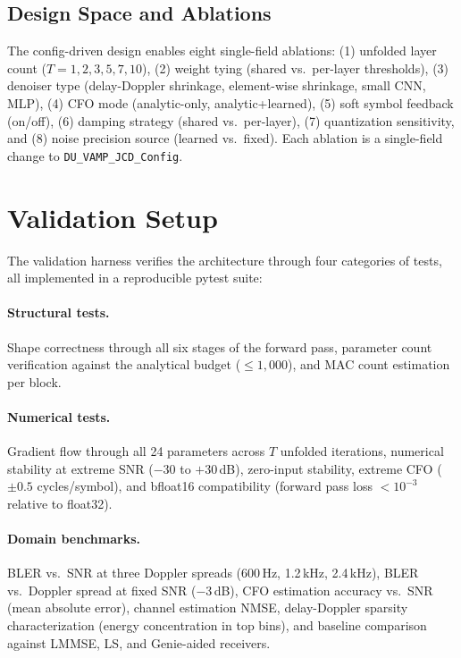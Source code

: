 \documentclass{article}
\begin{document}
\subsection{Design Space and Ablations}

The config-driven design enables eight single-field ablations: (1) unfolded layer count ($T = 1, 2, 3, 5, 7, 10$), (2) weight tying (shared vs.\ per-layer thresholds), (3) denoiser type (delay-Doppler shrinkage, element-wise shrinkage, small CNN, MLP), (4) CFO mode (analytic-only, analytic+learned), (5) soft symbol feedback (on/off), (6) damping strategy (shared vs.\ per-layer), (7) quantization sensitivity, and (8) noise precision source (learned vs.\ fixed). Each ablation is a single-field change to \texttt{DU\_VAMP\_JCD\_Config}.

\section{Validation Setup}
\label{sec:validation}

The validation harness verifies the architecture through four categories of tests, all implemented in a reproducible pytest suite:

\paragraph{Structural tests.} Shape correctness through all six stages of the forward pass, parameter count verification against the analytical budget ($\leq 1{,}000$), and MAC count estimation per block.

\paragraph{Numerical tests.} Gradient flow through all 24 parameters across $T$ unfolded iterations, numerical stability at extreme SNR ($-30$ to $+30$\,dB), zero-input stability, extreme CFO ($\pm 0.5$ cycles/symbol), and bfloat16 compatibility (forward pass loss $< 10^{-3}$ relative to float32).

\paragraph{Domain benchmarks.} BLER vs.\ SNR at three Doppler spreads (600\,Hz, 1.2\,kHz, 2.4\,kHz), BLER vs.\ Doppler spread at fixed SNR ($-3$\,dB), CFO estimation accuracy vs.\ SNR (mean absolute error), channel estimation NMSE, delay-Doppler sparsity characterization (energy concentration in top bins), and baseline comparison against LMMSE, LS, and Genie-aided receivers.
\end{document}
